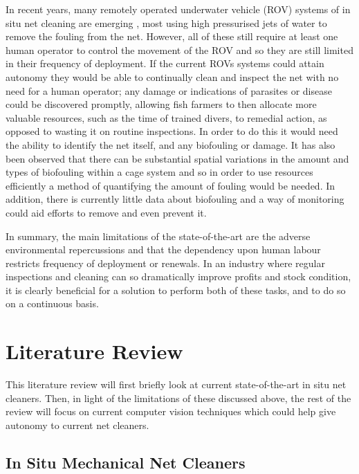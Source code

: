 \documentclass[11.5pt, twoside, a4paper]{article}
\begin{document}
In recent years, many remotely operated underwater vehicle (ROV) systems of in situ net cleaning are emerging \cite{AKVA, MIC, Yanmar}, most using high pressurised jets of water to remove the fouling from the net. However, all of these still require at least one human operator to control the movement of the ROV and so they are still limited in their frequency of deployment. If the current ROVs systems could attain autonomy they would be able to continually clean and inspect the net with no need for a human operator; any damage or indications of parasites or disease could be discovered promptly, allowing fish farmers to then allocate more valuable resources, such as the time of trained divers, to remedial action, as opposed to wasting it on routine inspections. In order to do this it would need the ability to identify the net itself, and any biofouling or damage.  It has also been observed that there can be substantial spatial variations in the amount and types of biofouling within a cage system \cite{fitridge2012impact,hodson1997biofouling} and so in order to use resources efficiently a method of quantifying the amount of fouling would be needed. In addition, there is currently little data about biofouling and a way of monitoring could aid efforts to remove and even prevent it.

In summary, the main limitations of the state-of-the-art are the adverse environmental repercussions and that the dependency upon human labour restricts frequency of deployment or renewals. In an industry where regular inspections and cleaning can so dramatically improve profits and stock condition, it is clearly beneficial for a solution to perform both of these tasks, and to do so on a continuous basis.

\section{Literature Review}

This literature review will first briefly look at current state-of-the-art in situ net cleaners. Then, in light of the limitations of these discussed above, the rest of the review will focus on current computer vision techniques which could help give autonomy to current net cleaners.

\subsection{In Situ Mechanical Net Cleaners}
\end{document}
